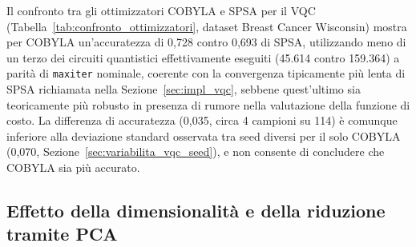Il confronto tra gli ottimizzatori COBYLA e SPSA per il VQC (Tabella~\ref{tab:confronto_ottimizzatori}, dataset Breast Cancer Wisconsin) mostra per COBYLA un'accuratezza di 0,728 contro 0,693 di SPSA, utilizzando meno di un terzo dei circuiti quantistici effettivamente eseguiti (45.614 contro 159.364) a parità di \texttt{maxiter} nominale, coerente con la convergenza tipicamente più lenta di SPSA richiamata nella Sezione~\ref{sec:impl_vqc}, sebbene quest'ultimo sia teoricamente più robusto in presenza di rumore nella valutazione della funzione di costo. La differenza di accuratezza (0,035, circa 4 campioni su 114) è comunque inferiore alla deviazione standard osservata tra seed diversi per il solo COBYLA (0,070, Sezione~\ref{sec:variabilita_vqc_seed}), e non consente di concludere che COBYLA sia più accurato.

\subsection{Effetto della dimensionalità e della riduzione tramite PCA}
